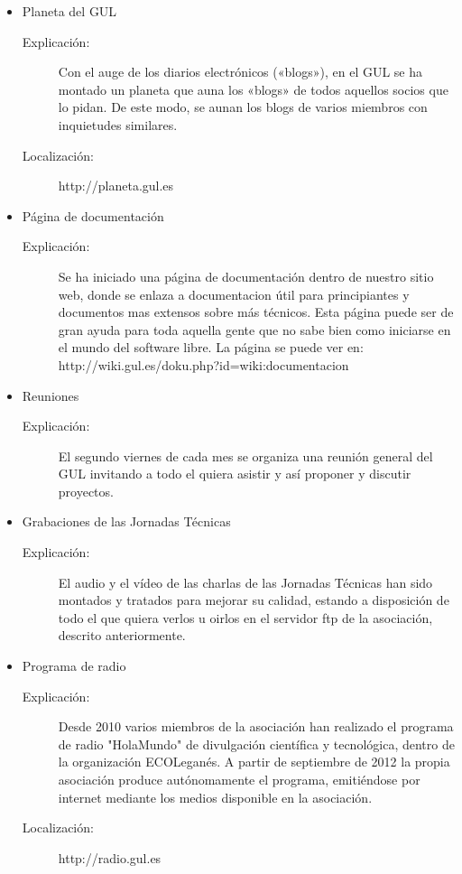 \documentclass[a4paper,12pt]{report}
\begin{document}
\begin{enumerate}
\begin{itemize}
\begin{description}
\end{description}
\item Planeta del GUL
\begin{description}
\item[Explicación:] Con el auge de los diarios electrónicos («blogs»), en
el GUL se ha montado un planeta que auna los «blogs» de todos aquellos
socios que lo pidan. De este modo, se aunan los blogs de varios miembros con inquietudes similares.
\item[Localización:] http://planeta.gul.es
\end{description}
\item Página de documentación
\begin{description}
\item[Explicación:] Se ha iniciado una página de documentación dentro de nuestro
 sitio web, donde se enlaza a documentacion útil para principiantes y documentos
mas extensos sobre más técnicos. Esta página puede ser de gran ayuda para toda aquella gente que no sabe bien como iniciarse en el mundo del software libre.
La página se puede ver en:\\
http://wiki.gul.es/doku.php?id=wiki:documentacion
\end{description}
\item Reuniones
\begin{description}
\item[Explicación:] El segundo viernes de cada mes se organiza una reunión
general del GUL invitando a todo el quiera asistir y así proponer y discutir
proyectos.
\end{description}
\item Grabaciones de las Jornadas Técnicas
\begin{description}
\item[Explicación:] El audio y el vídeo de las charlas de las Jornadas Técnicas han sido montados y tratados para mejorar su calidad, estando a disposición de todo el que quiera verlos u oirlos en el servidor ftp de la asociación, descrito anteriormente.
\end{description}

\pagebreak
\item Programa de radio
\begin{description}
\item[Explicación:] Desde 2010 varios miembros de la asociación han realizado el programa de radio "HolaMundo" de divulgación científica y tecnológica, dentro de la organización ECOLeganés.
A partir de septiembre de 2012 la propia asociación produce autónomamente el programa, emitiéndose por internet mediante los medios disponible en la asociación.
\item[Localización:] http://radio.gul.es
\end{description}


\end{itemize}
\end{enumerate}
\end{document}
